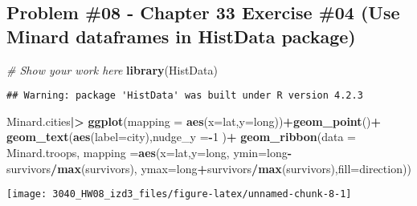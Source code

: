 \documentclass[
]{article}
\newenvironment{Shaded}{\begin{snugshade}}{\end{snugshade}}
\newcommand{\AttributeTok}[1]{\textcolor[rgb]{0.13,0.29,0.53}{#1}}
\newcommand{\CommentTok}[1]{\textcolor[rgb]{0.56,0.35,0.01}{\textit{#1}}}
\newcommand{\DecValTok}[1]{\textcolor[rgb]{0.00,0.00,0.81}{#1}}
\newcommand{\FunctionTok}[1]{\textcolor[rgb]{0.13,0.29,0.53}{\textbf{#1}}}
\newcommand{\NormalTok}[1]{#1}
\newcommand{\SpecialCharTok}[1]{\textcolor[rgb]{0.81,0.36,0.00}{\textbf{#1}}}
\begin{document}
\hypertarget{problem-08---chapter-33-exercise-04-use-minard-dataframes-in-histdata-package}{%
\subsection{Problem \#08 - Chapter 33 Exercise \#04 (Use Minard
dataframes in HistData
package)}\label{problem-08---chapter-33-exercise-04-use-minard-dataframes-in-histdata-package}}

\begin{Shaded}
\begin{Highlighting}[]
\CommentTok{\# Show your work here}
\FunctionTok{library}\NormalTok{(HistData)}
\end{Highlighting}
\end{Shaded}

\begin{verbatim}
## Warning: package 'HistData' was built under R version 4.2.3
\end{verbatim}

\begin{Shaded}
\begin{Highlighting}[]
\NormalTok{Minard.cities}\SpecialCharTok{|\textgreater{}}
  \FunctionTok{ggplot}\NormalTok{(}\AttributeTok{mapping =} \FunctionTok{aes}\NormalTok{(}\AttributeTok{x=}\NormalTok{lat,}\AttributeTok{y=}\NormalTok{long))}\SpecialCharTok{+}\FunctionTok{geom\_point}\NormalTok{()}\SpecialCharTok{+}
  \FunctionTok{geom\_text}\NormalTok{(}\FunctionTok{aes}\NormalTok{(}\AttributeTok{label=}\NormalTok{city),}\AttributeTok{nudge\_y =}\SpecialCharTok{{-}}\DecValTok{1}\NormalTok{ )}\SpecialCharTok{+}
  \FunctionTok{geom\_ribbon}\NormalTok{(}\AttributeTok{data =}\NormalTok{ Minard.troops,}
              \AttributeTok{mapping =}\FunctionTok{aes}\NormalTok{(}\AttributeTok{x=}\NormalTok{lat,}\AttributeTok{y=}\NormalTok{long,}
                        \AttributeTok{ymin=}\NormalTok{long}\SpecialCharTok{{-}}\NormalTok{survivors}\SpecialCharTok{/}\FunctionTok{max}\NormalTok{(survivors),}
                        \AttributeTok{ymax=}\NormalTok{long}\SpecialCharTok{+}\NormalTok{survivors}\SpecialCharTok{/}\FunctionTok{max}\NormalTok{(survivors),}\AttributeTok{fill=}\NormalTok{direction))}
\end{Highlighting}
\end{Shaded}

\texttt{[image: 3040\_HW08\_izd3\_files/figure-latex/unnamed-chunk-8-1]}
\end{document}
